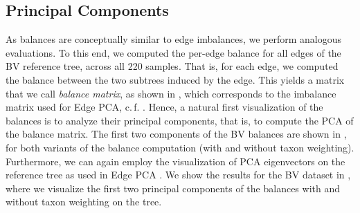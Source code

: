 
\subsection{Principal Components}
\label{ch:Balances:sec:Results:sub:PrincipalComponents}

As balances are conceptually similar to edge imbalances, we perform analogous evaluations.
To this end, we computed the per-edge balance for all edges of the \ac{BV} reference tree, across all \num{220} samples.
That is, for each edge, we computed the balance between the two subtrees induced by the edge.
This yields a matrix that we call \emph{balance matrix}, as shown in ,
which corresponds to the imbalance matrix used for Edge PCA, c.\,f. .
Hence, a natural first visualization of the balances is to analyze their principal components,
that is, to compute the PCA of the balance matrix.
The first two components of the \ac{BV} balances are shown in ,
for both variants of the balance computation (with and without taxon weighting).
Furthermore,
we can again employ the visualization of PCA eigenvectors on the reference tree as used in Edge PCA \cite{Matsen2011a}.
We show the results for %
the \ac{BV} dataset in ,
where we visualize the first two principal components of the balances with and without taxon weighting on the tree.

